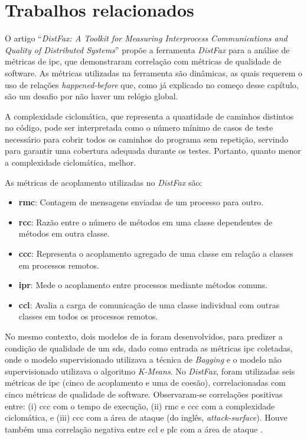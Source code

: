 \section{Trabalhos relacionados}
\label{section:related-work}

O artigo ``\textit{DistFax: A Toolkit for Measuring Interprocess Communications and Quality of Distributed Systems}'' \cite{DistFax} propõe a ferramenta \textit{DistFax} para a análise de métricas de \gls{ipc}, que demonstraram correlação com métricas de qualidade de software. As métricas utilizadas na ferramenta são dinâmicas, as quais requerem o uso de relações \textit{happened-before} que, como já explicado no começo desse capítulo, são um desafio por não haver um relógio global.

A complexidade ciclomática, que representa a quantidade de caminhos distintos no código, pode ser interpretada como o número mínimo de casos de teste necessário para cobrir todos os caminhos do programa sem repetição, servindo para garantir uma cobertura adequada durante os testes. Portanto, quanto menor a complexidade ciclomática, melhor.

As métricas de acoplamento utilizadas no \textit{DistFax} são:
\begin{itemize}
    \item \textbf{\gls{rmc}}: Contagem de mensagens enviadas de um processo para outro.
    \item \textbf{\gls{rcc}}: Razão entre o número de métodos em uma classe dependentes de métodos em outra classe.
    \item \textbf{\gls{ccc}}: Representa o acoplamento agregado de uma classe em relação a classes em processos remotos.
    \item \textbf{\gls{ipr}}: Mede o acoplamento entre processos mediante métodos comuns.
    \item \textbf{\gls{ccl}}: Avalia a carga de comunicação de uma classe individual com outras classes em todos os processos remotos.
\end{itemize}

No mesmo contexto, dois modelos de \gls{ia} foram desenvolvidos, para predizer a condição de qualidade de um \gls{sds}, dado como entrada as métricas \gls{ipc} coletadas, onde o modelo supervisionado utilizava a técnica de \textit{Bagging} e o modelo não supervisionado utilizava o algoritmo \textit{K-Means}. No \textit{DistFax}, foram utilizadas seis métricas de \gls{ipc} (cinco de acoplamento e uma de coesão), correlacionadas com cinco métricas de qualidade de software. Observaram-se correlações positivas entre: (i) \gls{ccc} com o tempo de execução, (ii) \gls{rmc} e \gls{ccc} com a complexidade ciclomática, e (iii) \gls{ccc} com a área de ataque (do inglês, \textit{attack-surface}). Houve também uma correlação negativa entre \gls{ccl} e \gls{plc} com a área de ataque \cite{DistFax}.


